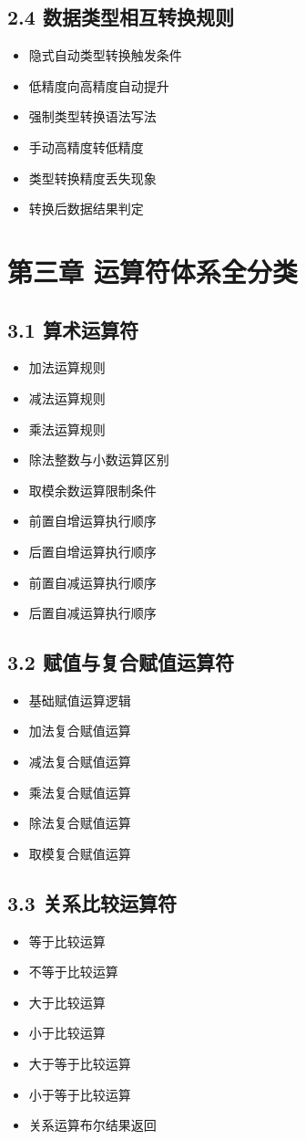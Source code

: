 \subsection{2.4 数据类型相互转换规则}
\begin{itemize}
\item 隐式自动类型转换触发条件
\item 低精度向高精度自动提升
\item 强制类型转换语法写法
\item 手动高精度转低精度
\item 类型转换精度丢失现象
\item 转换后数据结果判定
\end{itemize}

\section{第三章 运算符体系全分类}
\subsection{3.1 算术运算符}
\begin{itemize}
\item 加法运算规则
\item 减法运算规则
\item 乘法运算规则
\item 除法整数与小数运算区别
\item 取模余数运算限制条件
\item 前置自增运算执行顺序
\item 后置自增运算执行顺序
\item 前置自减运算执行顺序
\item 后置自减运算执行顺序
\end{itemize}

\subsection{3.2 赋值与复合赋值运算符}
\begin{itemize}
\item 基础赋值运算逻辑
\item 加法复合赋值运算
\item 减法复合赋值运算
\item 乘法复合赋值运算
\item 除法复合赋值运算
\item 取模复合赋值运算
\end{itemize}

\subsection{3.3 关系比较运算符}
\begin{itemize}
\item 等于比较运算
\item 不等于比较运算
\item 大于比较运算
\item 小于比较运算
\item 大于等于比较运算
\item 小于等于比较运算
\item 关系运算布尔结果返回
\end{itemize}

